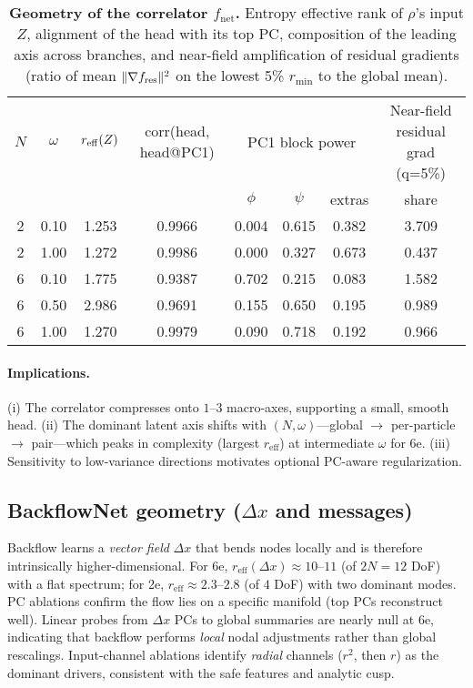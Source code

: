 \begin{table*}[t] \centering \small \setlength{\tabcolsep}{6.5pt} \begin{tabular}{cccccccc} \toprule $N$ & $\omega$ & $r_{\rm eff}(Z)$ & corr(head, head@PC1) & \multicolumn{3}{c}{PC1 block power} & Near-field residual grad (q=5\%) \\ & & & & $\phi$ & $\psi$ & extras & share \\ \midrule 2 & 0.10 & 1.253 & 0.9966 & 0.004 & 0.615 & 0.382 & 3.709 \\ 2 & 1.00 & 1.272 & 0.9986 & 0.000 & 0.327 & 0.673 & 0.437 \\ 6 & 0.10 & 1.775 & 0.9387 & 0.702 & 0.215 & 0.083 & 1.582 \\ 6 & 0.50 & 2.986 & 0.9691 & 0.155 & 0.650 & 0.195 & 0.989 \\ 6 & 1.00 & 1.270 & 0.9979 & 0.090 & 0.718 & 0.192 & 0.966 \\ \bottomrule \end{tabular} \caption{\textbf{Geometry of the correlator $f_{\text{net}}$.} Entropy effective rank of $\rho$'s input $Z$, alignment of the head with its top PC, composition of the leading axis across branches, and near-field amplification of residual gradients (ratio of mean $\|\nabla f_{\rm res}\|^2$ on the lowest 5\% $r_{\min}$ to the global mean).} \label{tab:fnet-geometry} \end{table*}

\paragraph{Implications.}
(i) The correlator compresses onto $1$–$3$ macro-axes, supporting a small, smooth head.
(ii) The dominant latent axis shifts with $(N,\omega)$—global $\rightarrow$ per-particle $\rightarrow$ pair—which
peaks in complexity (largest $r_{\text{eff}}$) at intermediate $\omega$ for 6e.
(iii) Sensitivity to low-variance directions motivates optional PC-aware regularization.

\subsection{BackflowNet geometry ($\Delta x$ and messages)}
Backflow learns a \emph{vector field} $\Delta x$ that bends nodes locally and is therefore intrinsically higher-dimensional.
For 6e, $r_{\text{eff}}(\Delta x)\!\approx\!10$–$11$ (of $2N{=}12$ DoF) with a flat spectrum; for 2e, $r_{\text{eff}}\!\approx\!2.3$–$2.8$
(of $4$ DoF) with two dominant modes. PC ablations confirm the flow lies on a specific manifold (top PCs reconstruct well).
Linear probes from $\Delta x$ PCs to global summaries are nearly null at 6e, indicating that backflow performs \emph{local}
nodal adjustments rather than global rescalings. Input-channel ablations identify \emph{radial} channels ($r^2$, then $r$)
as the dominant drivers, consistent with the safe features and analytic cusp.

